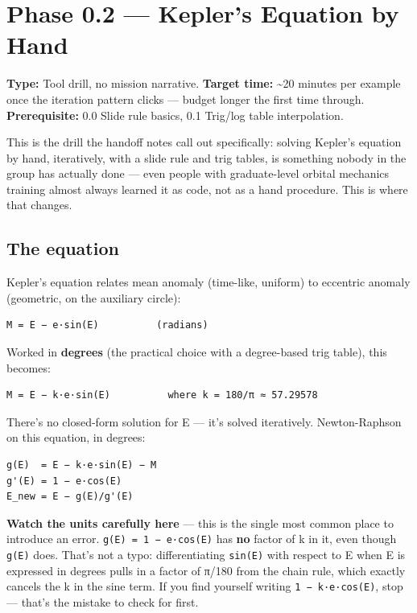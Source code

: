 \documentclass[
  10pt,
]{article}
\author{}
\date{}
\begin{document}
\hypertarget{phase-0.2-keplers-equation-by-hand}{%
\section{Phase 0.2 --- Kepler's Equation by
Hand}\label{phase-0.2-keplers-equation-by-hand}}

\textbf{Type:} Tool drill, no mission narrative. \textbf{Target time:}
\textasciitilde20 minutes per example once the iteration pattern clicks
--- budget longer the first time through. \textbf{Prerequisite:} 0.0
Slide rule basics, 0.1 Trig/log table interpolation.

This is the drill the handoff notes call out specifically: solving
Kepler's equation by hand, iteratively, with a slide rule and trig
tables, is something nobody in the group has actually done --- even
people with graduate-level orbital mechanics training almost always
learned it as code, not as a hand procedure. This is where that changes.

\hypertarget{the-equation}{%
\subsection{The equation}\label{the-equation}}

Kepler's equation relates mean anomaly (time-like, uniform) to eccentric
anomaly (geometric, on the auxiliary circle):

\begin{verbatim}
M = E − e·sin(E)          (radians)
\end{verbatim}

Worked in \textbf{degrees} (the practical choice with a degree-based
trig table), this becomes:

\begin{verbatim}
M = E − k·e·sin(E)          where k = 180/π ≈ 57.29578
\end{verbatim}

There's no closed-form solution for E --- it's solved iteratively.
Newton-Raphson on this equation, in degrees:

\begin{verbatim}
g(E)  = E − k·e·sin(E) − M
g'(E) = 1 − e·cos(E)
E_new = E − g(E)/g'(E)
\end{verbatim}

\textbf{Watch the units carefully here} --- this is the single most
common place to introduce an error.
\texttt{g\textquotesingle{}(E)\ =\ 1\ −\ e·cos(E)} has \textbf{no}
factor of k in it, even though \texttt{g(E)} does. That's not a typo:
differentiating \texttt{sin(E)} with respect to E when E is expressed in
degrees pulls in a factor of π/180 from the chain rule, which exactly
cancels the k in the sine term. If you find yourself writing
\texttt{1\ −\ k·e·cos(E)}, stop --- that's the mistake to check for
first.
\end{document}

